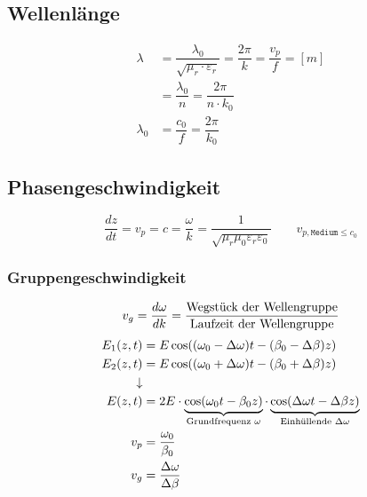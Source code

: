 \subsection{Wellenlänge}
\begin{align*}
    \lambda   & = \dfrac{\lambda_0}{\sqrt{\mu_r \cdot \varepsilon_r}} = \dfrac{2 \pi}{k} = \dfrac{v_p}{f} = [m] \\
              & = \dfrac{\lambda_0}{n} = \dfrac{2 \pi}{n \cdot k_0}                                             \\
    \lambda_0 & = \dfrac{c_0}{f} = \dfrac{2\pi}{k_0}
\end{align*}

\subsection{Phasengeschwindigkeit}
\[
    \dfrac{d z}{d t} = v_p = c = \dfrac{\omega}{k} = \frac{1}{\sqrt{ \mu_r \mu_0 \varepsilon_r \varepsilon_0}} \qquad v_{p,\texttt{Medium} \leq c_0}
\]

\subsubsection{Gruppengeschwindigkeit}
\[
    v_g = \dfrac{d \omega}{d k} = \dfrac{\textnormal{Wegstück der Wellengruppe}}{\textnormal{Laufzeit der Wellengruppe}}
\]
\begin{align*}
    E_1(z,t)   & = E\cos((\omega_0-\Delta\omega)t-(\beta_0-\Delta\beta)z)                                                                                                                                     \\
    E_2(z,t)   & = E\cos((\omega_0+\Delta\omega)t-(\beta_0+\Delta\beta)z)                                                                                                                                     \\
    \downarrow &                                                                                                                                                                                              \\
    E(z,t)     & = 2E\cdot\underbrace{\cos(\omega_0t-\beta_0z)}_{\mathclap{\text{Grundfrequenz $\omega$}}}\cdot\underbrace{\cos(\Delta\omega t-\Delta\beta z)}_{\mathclap{\text{Einhüllende $\Delta\omega$}}} \\
    v_p        & = \frac{\omega_0}{\beta_0}                                                                                                                                                                   \\
    v_g        & = \frac{\Delta\omega}{\Delta\beta}
\end{align*}

